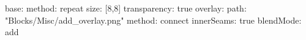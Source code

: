 base:
  method: repeat
  size: [8,8]
  transparency: true
overlay:
  path: "Blocks/Misc/add_overlay.png"
  method: connect
  innerSeams: true
  blendMode: add